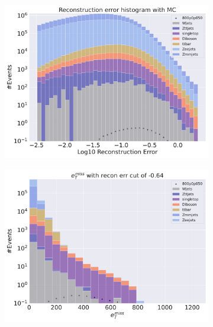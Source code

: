 \begin{figure}[H]
    \centering
    \begin{subfigure}{.40\textwidth}
        \includegraphics[width=\textwidth]{Figures/VAE_testing/small/2lep/b_data_recon_big_rm3_feats_sig_800p0p050_.pdf}
        \caption{ }
        \label{fig:VAE_2lep_small_800_2}
    \end{subfigure}
    \hfill
    \begin{subfigure}{.40\textwidth}
        \includegraphics[width=\textwidth]{Figures/VAE_testing/small/2lep/b_data_recon_big_rm3_feats_sig_800p0p050_recon_errcut_-0.64.pdf}
        \caption{}
        \label{fig:VAE_2lep_small_etmiss_800_2}
    \end{subfigure}

\end{figure}
